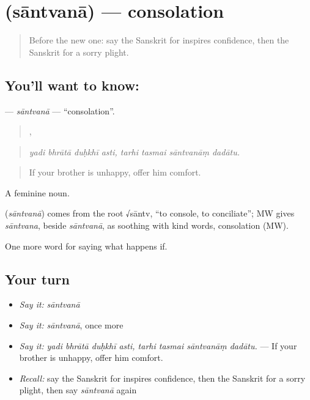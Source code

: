 \section[\texorpdfstring{\sk{सान्त्वना} (sāntvanā)}{सान्त्वना (sāntvanā)}]{ (sāntvanā) — consolation}

\label{lesson:SA-C548-santvana}



\begin{quote}
Before the new one: say the Sanskrit for inspires confidence, then the Sanskrit for a sorry plight.
\end{quote}

\subsection*{You'll want to know: }
\textbf{} — \emph{sāntvanā} — \textquotedblleft{}consolation\textquotedblright{}.

\begin{quote}
   ,    
\end{quote}

\begin{quote}
\emph{yadi bhrātā duḥkhī asti, tarhi tasmai sāntvanāṃ dadātu.}
\end{quote}

\begin{quote}
If your brother is unhappy, offer him comfort.
\end{quote}

A feminine noun.

\begin{cousinweb}
\textbf{} (\emph{sāntvanā}) comes from the root √sāntv, \textquotedblleft{}to console, to conciliate\textquotedblright{}; MW gives \emph{sāntvana}, beside \emph{sāntvanā}, as soothing with kind words, consolation (MW).
\end{cousinweb}

\begin{grammarlens}[title={What you've built}]
One more word for saying what happens if.
\end{grammarlens}

\subsection*{Your turn}
\begin{itemize}
\raggedright
  \item \emph{Say it:} \emph{sāntvanā}
  \item \emph{Say it:} \emph{sāntvanā}, once more
  \item \emph{Say it:} \emph{yadi bhrātā duḥkhī asti, tarhi tasmai sāntvanāṃ dadātu.} — If your brother is unhappy, offer him comfort.
  \item \emph{Recall:} say the Sanskrit for inspires confidence, then the Sanskrit for a sorry plight, then say \emph{sāntvanā} again
\end{itemize}

